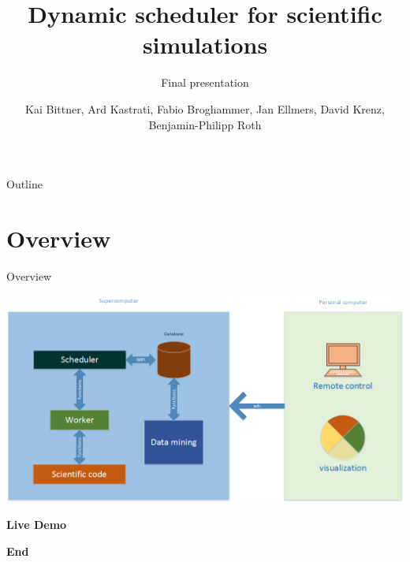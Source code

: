 \documentclass[18pt]{beamer}
\title[Specification presentation]{Dynamic scheduler for scientific simulations}
\subtitle{Final presentation}
\author{Kai Bittner, Ard Kastrati, Fabio Broghammer, Jan Ellmers, David Krenz, Benjamin-Philipp Roth}
\institute{Steinbuch Centre for Computing - SCC}
\begin{document}

\begin{frame}
\titlepage
\end{frame}




\begin{frame}{Outline}
\tableofcontents
\end{frame}

\section{Overview}
\begin{frame}{Overview}

\centerline{\includegraphics[scale=0.43]{images/overview}}
\end{frame}




\begin{frame}
	\begin{center}
			\huge{\textbf{Live Demo}}
	\end{center}		
\end{frame}


\begin{frame}
	\begin{center}
			\huge{\textbf{End}}
	\end{center}		
\end{frame}
\end{document}
